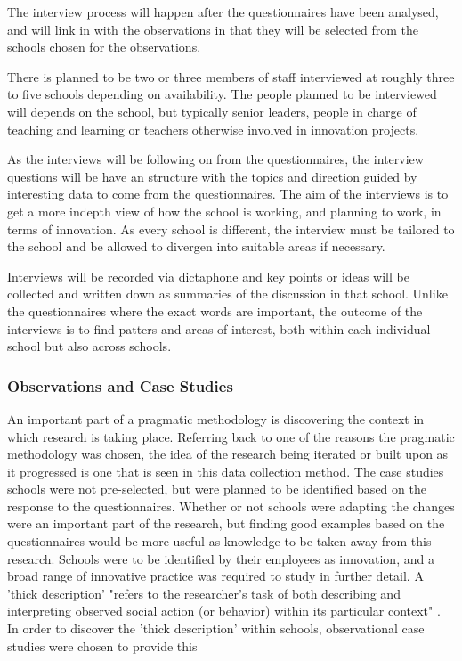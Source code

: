 The interview process will happen after the questionnaires have been analysed, and will link in with the observations in that they will be selected from the schools chosen for the observations.

There is planned to be two or three members of staff interviewed at roughly three to five schools depending on availability. The people planned to be interviewed will depends on the school, but typically senior leaders, people in charge of teaching and learning or teachers otherwise involved in innovation projects.

As the interviews will be following on from the questionnaires, the interview questions will be have an structure with the topics and direction guided by interesting data to come from the questionnaires. The aim of the interviews is to get a more indepth view of how the school is working, and planning to work, in terms of innovation. As every school is different, the interview must be tailored to the school and be allowed to divergen into suitable areas if necessary. 

Interviews will be recorded via dictaphone and key points or ideas will be collected and written down as summaries of the discussion in that school. Unlike the questionnaires where the exact words are important, the outcome of the interviews is to find patters and areas of interest, both within each individual school but also across schools.

\subsubsection{Observations and Case Studies}  An important part of a pragmatic methodology is discovering the context in which research is taking place. Referring back to one of the reasons the pragmatic methodology was chosen, the idea of the research being iterated or built upon as it progressed is one that is seen in this data collection method. The case studies schools were not pre-selected, but were planned to be identified based on the response to the questionnaires. Whether or not schools were adapting the changes were an important part of the research, but finding good examples based on the questionnaires would be more useful as knowledge to be taken away from this research. Schools were to be identified by their employees as innovation, and a broad range of innovative practice was required to study in further detail. A 'thick description' "refers to the researcher’s task of both describing and interpreting observed social action (or behavior) within its particular context" \cite[p. 543]{thickdescription}. In order to discover the 'thick description' within schools, observational case studies were chosen to provide this

